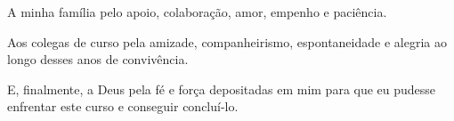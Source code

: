 \begin{agradecimentos}

A minha família pelo apoio, colaboração, amor, empenho e paciência. 

Aos colegas de curso pela amizade, companheirismo, espontaneidade e alegria ao longo desses anos de convivência.

E, finalmente, a Deus pela fé e força depositadas em mim para que eu pudesse enfrentar este curso e conseguir concluí-lo.
\end{agradecimentos}
